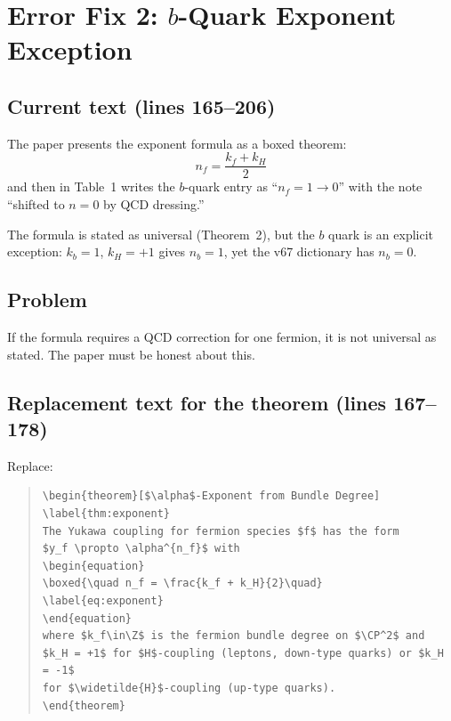 \documentclass[11pt]{article}
\begin{document}
\section*{Error Fix 2: $b$-Quark Exponent Exception}

\subsection*{Current text (lines 165--206)}

The paper presents the exponent formula as a boxed theorem:
\[
n_f = \frac{k_f + k_H}{2}
\]
and then in Table~1 writes the $b$-quark entry as
``$n_f = 1 \to 0$'' with the note ``shifted to $n=0$ by QCD dressing.''

The formula is stated as universal (Theorem~2), but the $b$ quark is
an explicit exception: $k_b = 1$, $k_H = +1$ gives $n_b = 1$, yet
the v67 dictionary has $n_b = 0$.

\subsection*{Problem}

If the formula requires a QCD correction for one fermion, it is not
universal as stated. The paper must be honest about this.

\subsection*{Replacement text for the theorem (lines 167--178)}

Replace:
\begin{quote}
\begin{verbatim}
\begin{theorem}[$\alpha$-Exponent from Bundle Degree]
\label{thm:exponent}
The Yukawa coupling for fermion species $f$ has the form
$y_f \propto \alpha^{n_f}$ with
\begin{equation}
\boxed{\quad n_f = \frac{k_f + k_H}{2}\quad}
\label{eq:exponent}
\end{equation}
where $k_f\in\Z$ is the fermion bundle degree on $\CP^2$ and
$k_H = +1$ for $H$-coupling (leptons, down-type quarks) or $k_H = -1$
for $\widetilde{H}$-coupling (up-type quarks).
\end{theorem}
\end{verbatim}
\end{quote}
\end{document}
